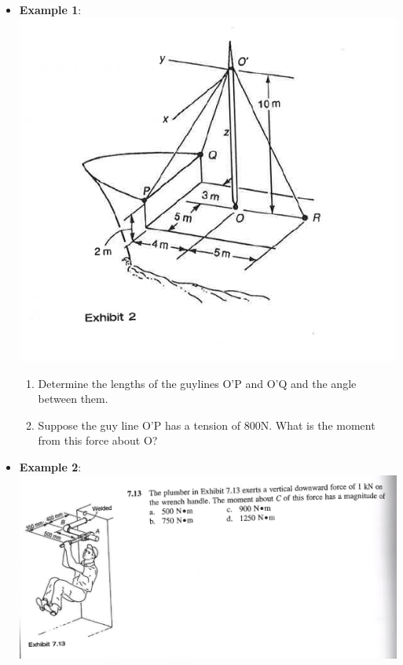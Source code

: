 \documentclass[11pt]{article}
\begin{document}
\newpage
\begin{itemize}

	\item  \textbf{\LARGE Example 1}:\\
\includegraphics[scale=.75]{lecture1_fig1.png}
		\LARGE
		\begin{enumerate}
			\item Determine the lengths of the guylines O'P and O'Q and the angle between them.\\

			\item Suppose the guy line O'P has a tension of 800N. What is the moment from this force about O?

		\end{enumerate}

\newpage
	\item  \textbf{\LARGE Example 2}:\\
\includegraphics[scale=.5]{lecture1_fig2.png}
		\LARGE


\end{itemize}
\end{document}
